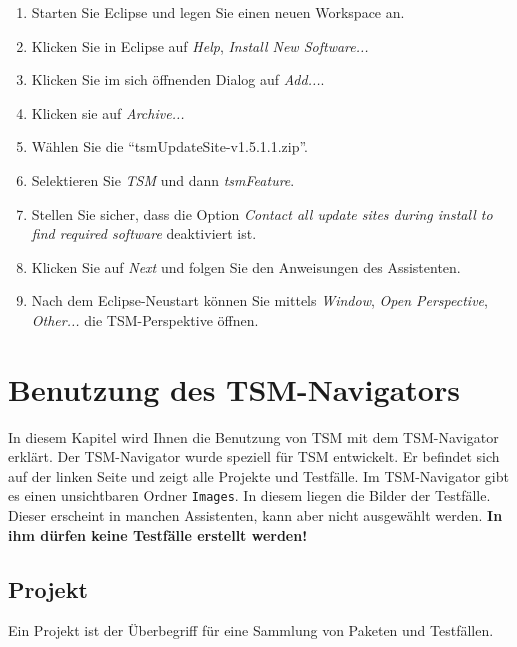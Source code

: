 \documentclass[11pt,a4paper,titlepage]{article}
\begin{document}
\begin{enumerate}
 \item Starten Sie Eclipse und legen Sie einen neuen Workspace an.
 \item Klicken Sie in Eclipse auf \textit{Help}, \textit{Install New Software...}
 \item Klicken Sie im sich öffnenden Dialog auf \textit{Add...}.
 \item Klicken sie auf \textit{Archive...}
 \item Wählen Sie die "`tsmUpdateSite-v1.5.1.1.zip"'.
 \item Selektieren Sie \textit{TSM} und dann \textit{tsmFeature}.
 \item Stellen Sie sicher, dass die Option \textit{Contact all update sites during install to find required software} deaktiviert ist.
 \item Klicken Sie auf \textit{Next} und folgen Sie den Anweisungen des Assistenten.
 \item Nach dem Eclipse-Neustart können Sie mittels \textit{Window}, \textit{Open Perspective}, \textit{Other...} die TSM-Perspektive öffnen.
\end{enumerate}


\section{Benutzung des TSM-Navigators}
In diesem Kapitel wird Ihnen die Benutzung von TSM mit dem TSM-Navigator erklärt. Der TSM-Navigator wurde speziell für TSM entwickelt.
Er befindet sich auf der linken Seite und zeigt alle Projekte und Testfälle. Im TSM-Navigator gibt es einen unsichtbaren Ordner \texttt{Images}. In diesem liegen die Bilder der Testfälle.
Dieser erscheint in manchen Assistenten, kann aber nicht ausgewählt werden. \textbf{In ihm dürfen keine Testfälle erstellt werden!}

\subsection{Projekt}
Ein Projekt ist der Überbegriff für eine Sammlung von Paketen und Testfällen.
\end{document}
